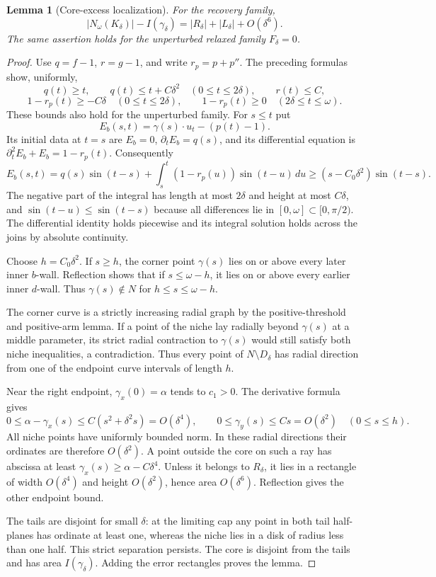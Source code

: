 \documentclass[11pt]{article}
\newtheorem{lemma}{Lemma}
\begin{document}
\begin{lemma}[Core-excess localization]
For the recovery family,
\[
 |N_\omega(K_\delta)|-I(\gamma_\delta)
 =|R_\delta|+|L_\delta|+O(\delta^6).
\]
The same assertion holds for the unperturbed relaxed family $F_\delta=0$.
\end{lemma}
\begin{proof}
Use $q=f-1$, $r=g-1$, and write $r_p=p+p''$. The preceding formulas show, uniformly,
\[
 q(t)\ge t,\qquad q(t)\le t+C\delta^2\quad(0\le t\le2\delta),\qquad r(t)\le C,
\]
\[
 1-r_p(t)\ge-C\delta\quad(0\le t\le2\delta),\qquad
 1-r_p(t)\ge0\quad(2\delta\le t\le\omega).
\]
These bounds also hold for the unperturbed family. For $s\le t$ put
\[
 E_b(s,t)=\gamma(s)\cdot u_t-(p(t)-1).
\]
Its initial data at $t=s$ are $E_b=0$, $\partial_tE_b=q(s)$, and its differential equation is $\partial_t^2E_b+E_b=1-r_p(t)$. Consequently
\[
 E_b(s,t)=q(s)\sin(t-s)+\int_s^t(1-r_p(u))\sin(t-u)\,du
 \ge(s-C_0\delta^2)\sin(t-s).
\]
The negative part of the integral has length at most $2\delta$ and height at most $C\delta$, and $\sin(t-u)\le\sin(t-s)$ because all differences lie in $[0,\omega]\subset[0,\pi/2)$. The differential identity holds piecewise and its integral solution holds across the joins by absolute continuity.

Choose $h=C_0\delta^2$. If $s\ge h$, the corner point $\gamma(s)$ lies on or above every later inner $b$-wall. Reflection shows that if $s\le\omega-h$, it lies on or above every earlier inner $d$-wall. Thus $\gamma(s)\notin N$ for $h\le s\le\omega-h$.

The corner curve is a strictly increasing radial graph by the positive-threshold and positive-arm lemma. If a point of the niche lay radially beyond $\gamma(s)$ at a middle parameter, its strict radial contraction to $\gamma(s)$ would still satisfy both niche inequalities, a contradiction. Thus every point of $N\setminus D_\delta$ has radial direction from one of the endpoint curve intervals of length $h$.

Near the right endpoint, $\gamma_x(0)=\alpha$ tends to $c_1>0$. The derivative formula gives
\[
 0\le\alpha-\gamma_x(s)\le C(s^2+\delta^2s)=O(\delta^4),\qquad
 0\le\gamma_y(s)\le Cs=O(\delta^2)\quad(0\le s\le h).
\]
All niche points have uniformly bounded norm. In these radial directions their ordinates are therefore $O(\delta^2)$. A point outside the core on such a ray has abscissa at least $\gamma_x(s)\ge\alpha-C\delta^4$. Unless it belongs to $R_\delta$, it lies in a rectangle of width $O(\delta^4)$ and height $O(\delta^2)$, hence area $O(\delta^6)$. Reflection gives the other endpoint bound.

The tails are disjoint for small $\delta$: at the limiting cap any point in both tail half-planes has ordinate at least one, whereas the niche lies in a disk of radius less than one half. This strict separation persists. The core is disjoint from the tails and has area $I(\gamma_\delta)$. Adding the error rectangles proves the lemma.
\end{proof}
\end{document}
